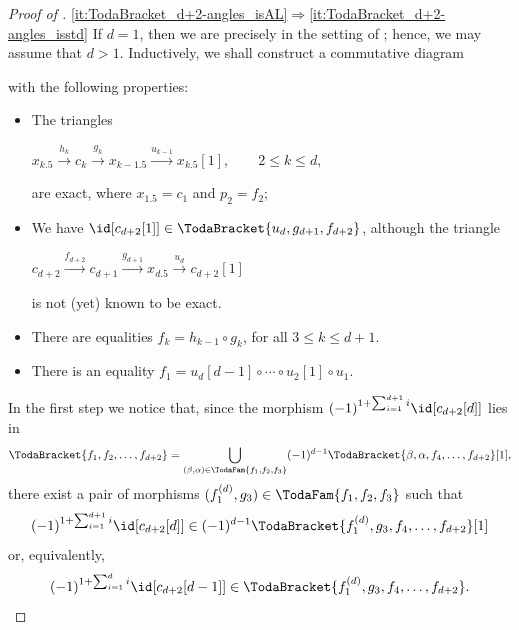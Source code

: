 \documentclass[a4paper]{amsart}
\begin{document}
\begin{proof}[Proof of ]
  \eqref{it:TodaBracket_d+2-angles_isAL}$\Rightarrow$\eqref{it:TodaBracket_d+2-angles_isstd}
  If $d=1$, then we are precisely in the setting of
  ; hence, we may assume that $d>1$. Inductively,
  we shall construct a commutative diagram
  \begin{center}
  \end{center}
  with the following properties:
  \begin{itemize}
  \item The triangles
    \begin{center}
      $x_{k.5}\xrightarrow{h_k}c_k\xrightarrow{g_k}
      x_{k-1.5}\xrightarrow{u_{k-1}} x_{k.5}[1],\qquad 2\leq k\leq d,$
    \end{center}
    are exact, where $x_{1.5}=c_1$ and $p_2=f_2$;
  \item We have $\id[c_{d+2}[1]]\in\TodaBracket{u_d,g_{d+1},f_{d+2}}$, although the
    triangle
    \begin{center}
      $c_{d+2}\xrightarrow{f_{d+2}}c_{d+1}\xrightarrow{g_{d+1}}x_{d.5}\xrightarrow{u_d}
      c_{d+2}[1]$
    \end{center}
    is not (yet) known to be exact.
  \item There are equalities $f_k=h_{k-1}\circ g_k$, for all $3\leq k\leq d+1$.
  \item There is an equality $f_1= u_d[d-1]\circ\cdots\circ u_2[1]\circ u_1$.
  \end{itemize}
  In the first step we notice that, since the morphism
  $(-1)^{1+\sum_{i=1}^{d+1}i}\id[c_{d+2}[d]]$ lies in
  \[
    \TodaBracket{f_1,f_2,\dots,f_{d+2}}=\bigcup_{(\beta,\alpha)\in\TodaFam{f_1,f_2,f_3}}(-1)^{d-1}\TodaBracket{\beta,\alpha,f_4,\dots,f_{d+2}}[1],
  \]
  there exist a pair of morphisms $(f_1^{(d)},g_3)\in\TodaFam{f_1,f_2,f_3}$ such
  that
  \[
    (-1)^{1+\sum_{i=1}^{d+1}i}\id[c_{d+2}[d]]\in(-1)^{d-1}\TodaBracket{f_1^{(d)},g_3,f_4,\dots,f_{d+2}}[1]
  \]
  or, equivalently,
  \[
    (-1)^{1+\sum_{i=1}^{d}i}\id[c_{d+2}[d-1]]\in\TodaBracket{f_1^{(d)},g_3,f_4,\dots,f_{d+2}}.
\]
\end{proof}
\end{document}
